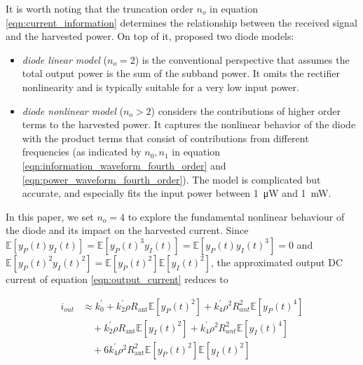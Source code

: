 It is worth noting that the truncation order ${n_o}$ in equation \ref{eqn:current_information} determines the relationship between the received signal and the harvested power. On top of it, \cite{Clerckx2016} proposed two diode models:

\begin{itemize}
  \item \textit{diode linear model} (${n_o} = 2$) is the conventional perspective that assumes the total output power is the sum of the subband power. It omits the rectifier nonlinearity and is typically suitable for a very low input power.
  \item \textit{diode nonlinear model} (${n_o} > 2$) considers the contributions of higher order terms to the harvested power. It captures the nonlinear behavior of the diode with the product terms that consist of contributions from different frequencies (as indicated by ${{n_0},{n_1}}$ in equation \ref{eqn:information_waveform_fourth_order} and \ref{eqn:power_waveform_fourth_order}). The model is complicated but accurate, and especially fits the input power between \SI{1}{\uW} and \SI{1}{\mW}.
\end{itemize} 

In this paper, we set ${n_o} = 4$ to explore the fundamental nonlinear behaviour of the diode and its impact on the harvested current. Since $\mathbb{E}\left[ {{y_P}(t){y_I}(t)} \right] = \mathbb{E}\left[ {{y_P}{{(t)}^3}{y_I}(t)} \right] = \mathbb{E}\left[ {{y_P}(t){y_I}{{(t)}^3}} \right] = 0$ and $\mathbb{E}\left[ {{y_P}{{(t)}^2}{y_I}{{(t)}^2}} \right] = \mathbb{E}\left[ {{y_P}{{(t)}^2}} \right]\mathbb{E}\left[ {{y_I}{{(t)}^2}} \right]$, the approximated output DC current of equation \ref{eqn:output_current} reduces to

\begin{align}\label{eqn:current}
  {i_{out}} &\approx k_0^\prime  + k_2^\prime \rho {R_{{\text{ant}}}}\mathbb{E}\left[ {{y_P}{{(t)}^2}} \right] + k_4^\prime {\rho ^2}R_{ant}^2\mathbb{E}\left[ {{y_P}{{(t)}^4}} \right] \nonumber \\
   &\quad + k_2^\prime \rho {R_{{\text{ant}}}}\mathbb{E}\left[ {{y_I}{{(t)}^2}} \right] + k_4^\prime {\rho ^2}R_{ant}^2\mathbb{E}\left[ {{y_I}{{(t)}^4}} \right] \nonumber \\
   &\quad + 6k_4^\prime {\rho ^2}R_{{\text{ant}}}^2\mathbb{E}\left[ {{y_P}{{(t)}^2}} \right]\mathbb{E}\left[ {{y_I}{{(t)}^2}} \right]
\end{align}
